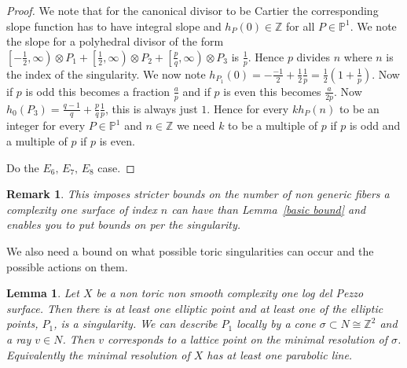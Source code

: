\documentclass[12pt]{amsart}
\theoremstyle{plain}
\newtheorem{lem}[thm]{Lemma}
\newtheorem*{rem}{Remark}
\newcommand{\mb}[1]{\mathbb{#1}}
\begin{document}
\begin{proof}
We note that for the canonical divisor to be Cartier the corresponding slope function has to have integral slope and $h_P(0) \in \mathbb{Z}$ for all $P \in \mb{P}^1$. We note the slope for a polyhedral divisor of the form $\left[-\frac{1}{2}, \infty \right) \otimes P_1 + \left[ \frac{1}{2}, \infty \right) \otimes P_2 + \left[ \frac{p}{q}, \infty \right) \otimes P_3$ is $\frac{1}{p}$. Hence $p$ divides $n$ where $n$ is the index of the singularity. We now note $h_{P_1} (0) = -\frac{-1}{2} + \frac{1}{2} \frac{1}{p} = \frac{1}{2} (1 + \frac{1}{p})$. Now if $p$ is odd this becomes a fraction $\frac{a}{p}$ and if $p$ is even this becomes $\frac{a}{2p}$. Now $h_0(P_3) = \frac{q-1}{q} + \frac{p}{q} \frac{1}{p}$, this is always just $1$. Hence for every $k h_P(n)$ to be an integer for every $P \in \mb{P}^1$ and $n \in \mb{Z}$ we need $k$ to be a multiple of $p$ if $p$ is odd and a multiple of $p$ if $p$ is even.


Do the $E_6, \, E_7,\, E_8$ case.
\end{proof}

\begin{rem}
This imposes stricter bounds on the number of non generic fibers a complexity one surface of index $n$ can have than Lemma~\ref{basic bound} and enables you to put bounds on per the singularity. 
\end{rem}

We also need a bound on what possible toric singularities can occur and the possible actions on them.

\begin{lem}{\label{Structure}}
Let $X$ be a non toric non smooth complexity one log del Pezzo surface. Then there is at least one elliptic point and at least one of the elliptic points, $P_1$, is a singularity.  We can describe $P_1$ locally by a cone $\sigma \subset N \cong \mb{Z}^2$ and a ray $v \in N$. Then $v$ corresponds to a lattice point on the minimal resolution of $\sigma$. Equivalently the minimal resolution of $X$ has at least one parabolic line.
\end{lem}
\end{document}
